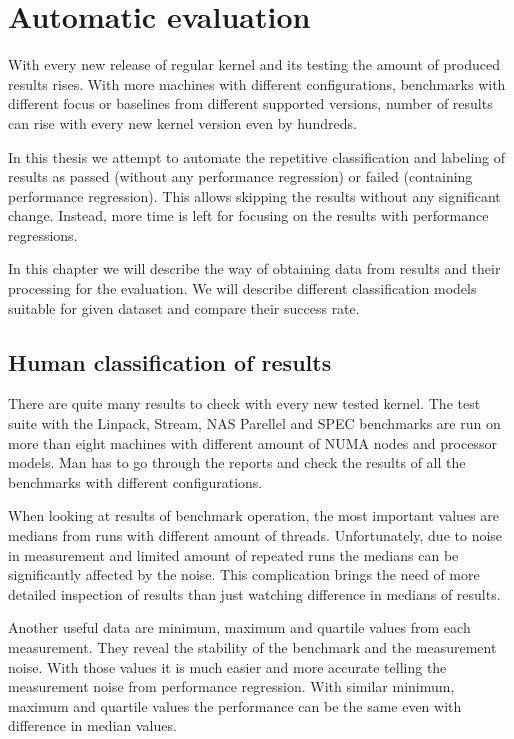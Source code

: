 \chapter{Automatic evaluation} \label{ch:ai}
With every new release of regular kernel and its testing the amount of produced
results rises. With more machines with different configurations, benchmarks with
different focus or baselines from different supported versions, number of results
can rise with every new kernel version even by hundreds.

In this thesis we attempt to automate the repetitive classification and
labeling of results as passed (without any performance regression) or failed
(containing performance regression). This allows skipping the results without
any significant change. Instead, more time is left for focusing on the results
with performance regressions.

In this chapter we will describe the way of obtaining data from results and
their processing for the evaluation. We will describe different classification
models suitable for given dataset and compare their success rate.

\section{Human classification of results}
There are quite many results to check with every new tested kernel. The test
suite with the Linpack, Stream, NAS Parellel and SPEC benchmarks are run on more
than eight machines with different amount of NUMA nodes and processor models.
Man has to go through the reports and check the results of all the benchmarks
with different configurations.

When looking at results of benchmark operation, the most important values are
medians from runs with different amount of threads. Unfortunately, due to noise in measurement
and limited amount of repeated runs the medians can be significantly affected by
the noise. This complication brings the need of more detailed inspection of
results than just watching difference in medians of results.

Another useful data are minimum, maximum and quartile values from each
measurement. They reveal the stability of the benchmark and the measurement
noise. With those values it is much easier and more accurate telling the
measurement noise from performance regression. With similar minimum, maximum and
quartile values the performance can be the same even with difference in median values.

